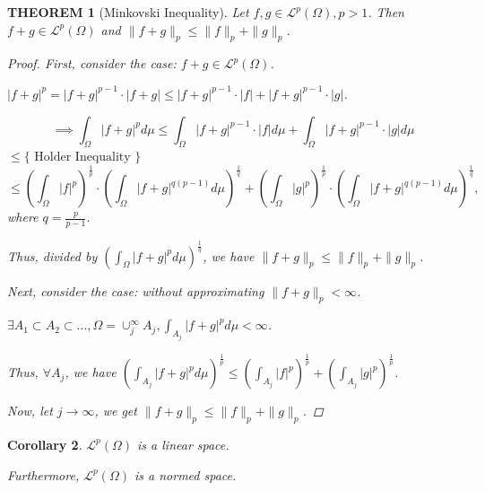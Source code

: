 \documentclass[12pt]{article}
\theoremstyle{blueplain}
\newtheorem{theorem}{THEOREM}[section]
\newtheorem{corollary}[theorem]{Corollary}
\theoremstyle{bluedef}
\theoremstyle{blueremark}
\newcommand{\mL}{\mathcal{L}}
\numberwithin{equation}{section}
\begin{document}
\begin{theorem}[Minkovski Inequality]
  Let $f,g \in \mL^p(\Omega), p>1$. Then $f+g \in \mL^p(\Omega)$ and $\|f+g\|_p \leq \|f\|_p + \|g\|_p$.
  \begin{proof}
    First, consider the case: $f+g \in \mL^p(\Omega)$.

    $|f+g|^p = |f+g|^{p-1} \cdot |f+g| \leq |f+g|^{p-1} \cdot |f| + |f+g|^{p-1} \cdot |g|$.

    $$\implies \int_\Omega |f+g|^p d\mu \leq \int_\Omega |f+g|^{p-1} \cdot |f| d\mu + \int_\Omega |f+g|^{p-1} \cdot |g| d\mu$$
    $\leq \{\text{ Holder Inequality }\}$
    $$\leq (\int_\Omega |f|^p)^\frac{1}{p} \cdot (\int_\Omega |f+g|^{q(p-1)} d\mu)^\frac{1}{q} + (\int_\Omega |g|^p)^\frac{1}{p} \cdot (\int_\Omega |f+g|^{q(p-1)} d\mu)^\frac{1}{q},$$ where $q = \frac{p}{p-1}$.

    Thus, divided by $(\int_\Omega |f+g|^p d\mu)^\frac{1}{q}$, we have $\|f+g\|_p \leq \|f\|_p + \|g\|_p$.

    Next, consider the case: without approximating $\|f+g\|_p < \infty$.

    $\exists A_1 \subset A_2 \subset \ldots, \Omega  = \cup_j^\infty A_j, \int_{A_j} |f+g|^p d\mu < \infty$.

    Thus, $\forall A_j$, we have $(\int_{A_j} |f+g|^p d\mu)^\frac{1}{p} \leq (\int_{A_j} |f|^p)^\frac{1}{p} + (\int_{A_j} |g|^p)^\frac{1}{p}$.

    Now, let $j \to \infty$, we get $\|f+g\|_p \leq \|f\|_p + \|g\|_p$.
  \end{proof}
\end{theorem}

\begin{corollary}
  $\mL^p(\Omega)$ is a linear space.

  Furthermore, $\mL^p(\Omega)$ is a normed space.
\end{corollary}
\end{document}

